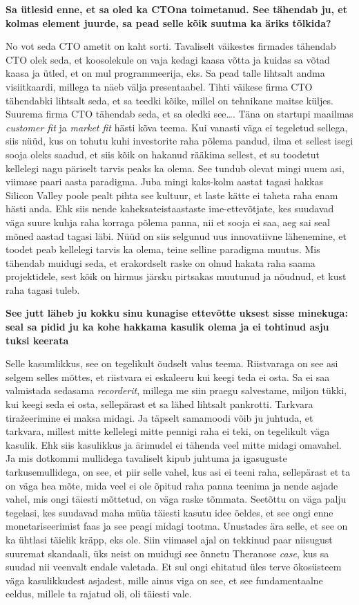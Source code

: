 \textbf{Sa ütlesid enne, et sa oled ka CTOna toimetanud. See tähendab ju, et 
kolmas element juurde, sa pead selle kõik suutma ka äriks tõlkida?}

No vot seda CTO ametit on kaht sorti. Tavaliselt väikestes firmades tähendab 
CTO olek seda, et koosolekule on vaja kedagi kaasa võtta ja kuidas sa võtad 
kaasa ja ütled, et on mul programmeerija, eks. Sa pead talle lihtsalt andma 
visiitkaardi, millega ta näeb välja presentaabel. Tihti väikese firma CTO 
tähendabki lihtsalt seda, et sa teedki kõike, millel on tehnikane maitse 
küljes. Suurema firma CTO tähendab seda, et sa oledki see\ldots. Täna on 
startupi maailmas \emph{customer fit} ja \emph{market fit} hästi kõva teema. 
Kui vanasti väga ei tegeletud sellega, siis nüüd, kus on tohutu kuhi 
investorite raha põlema pandud, ilma et sellest isegi sooja oleks saadud, et 
siis kõik on hakanud rääkima sellest, et su toodetut kellelegi nagu päriselt
tarvis peaks ka olema. See tundub olevat mingi uuem asi, viimase paari aasta 
paradigma. Juba mingi kaks-kolm aastat tagasi hakkas Silicon Valley poole pealt 
pihta see kultuur, et laste kätte ei taheta raha enam hästi anda. Ehk siis 
nende kaheksateistaastaste ime-ettevõtjate, kes suudavad  väga suure kuhja raha 
korraga põlema panna, nii et sooja ei saa, aeg sai seal mõned aastad 
tagasi läbi. Nüüd on siis  selgunud uus innovatiivne lähenemine, et toodet peab 
kellelegi tarvis ka olema, teine selline paradigma muutus. Mis tähendab muidugi 
seda, et erakordselt raske on olnud hakata raha saama projektidele, sest kõik 
on hirmus järsku pirtsakas muutunud ja nõudnud, et kust raha tagasi tuleb. 

\textbf{See jutt läheb ju kokku sinu kunagise ettevõtte uksest sisse minekuga: 
seal sa pidid ju ka kohe hakkama kasulik olema ja ei tohtinud asju tuksi 
keerata}

Selle kasumlikkus, see on tegelikult õudselt valus teema. Riistvaraga on see 
asi  selgem selles mõttes, et riistvara ei eskaleeru kui keegi teda ei osta. Sa ei 
saa valmistada sedasama \emph{recorderit}, millega me siin praegu salvestame, 
miljon tükki, kui keegi seda ei osta, sellepärast et sa lähed lihtsalt 
pankrotti. Tarkvara tiražeerimine ei maksa midagi. Ja täpselt samamoodi võib ju 
juhtuda, et tarkvara, millest mitte kellelegi mitte pennigi raha ei teki, on 
tegelikult väga kasulik. Ehk siis kasulikkus ja ärimudel ei tähenda veel mitte 
midagi omavahel. Ja mis  dotkommi mullidega tavaliselt kipub juhtuma ja 
igasuguste tarkusemullidega, on see, et piir selle vahel, kus asi ei teeni 
raha, sellepärast et ta on väga hea mõte, mida veel ei ole õpitud raha panna 
teenima ja nende asjade vahel, mis ongi täiesti mõttetud, on väga raske tõmmata. 
Seetõttu on väga palju tegelasi, kes suudavad maha müüa  täiesti kasutu idee 
öeldes, et see ongi enne monetariseerimist faas ja see peagi midagi tootma. 
Unustades ära selle, et see on ka ühtlasi täielik kräpp, eks ole. Siin  
viimasel ajal on tekkinud paar niisugust suuremat skandaali, üks neist on 
muidugi see õnnetu Theranose \emph{case}, kus sa suudad nii veenvalt endale 
valetada. Et sul ongi ehitatud üles terve ökosüsteem väga kasulikkudest 
asjadest, mille ainus viga on see, et see fundamentaalne eeldus, millele ta 
rajatud oli, oli täiesti vale. 

